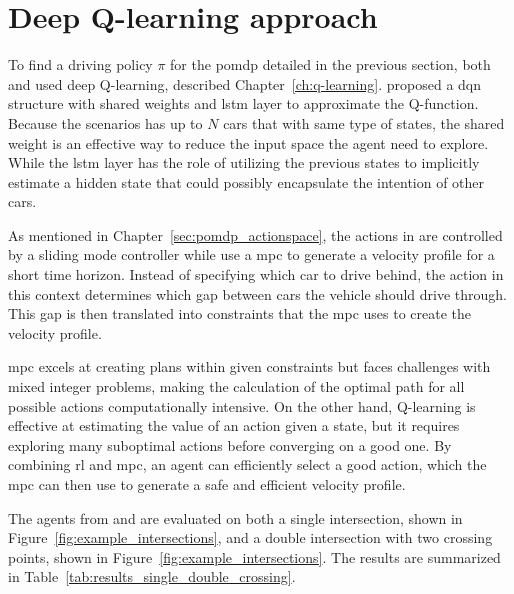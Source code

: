 \section{Deep Q-learning approach}
To find a driving policy $\pi$ for the \gls{pomdp} detailed in the previous section, both \paperLSTM and \paperMPC used deep Q-learning, described Chapter~\ref{ch:q-learning}. \paperLSTM proposed a \gls{dqn} structure with shared weights and \gls{lstm} layer to approximate the Q-function. Because the scenarios has up to $N$ cars that with same type of states, the shared weight is an effective way to reduce the input space the agent need to explore. While the \gls{lstm} layer has the role of utilizing the previous states to implicitly estimate a hidden state that could possibly encapsulate the intention of other cars.

As mentioned in Chapter~\ref{sec:pomdp_actionspace}, the actions in \paperLSTM are controlled by a sliding mode controller while \paperMPC use a \gls{mpc} to generate a velocity profile for a short time horizon. Instead of specifying which car to drive behind, the action in this context determines which gap between cars the vehicle should drive through. This gap is then translated into constraints that the \gls{mpc} uses to create the velocity profile.

\gls{mpc} excels at creating plans within given constraints but faces challenges with mixed integer problems, making the calculation of the optimal path for all possible actions computationally intensive. On the other hand, Q-learning is effective at estimating the value of an action given a state, but it requires exploring many suboptimal actions before converging on a good one. By combining \gls{rl} and \gls{mpc}, an agent can efficiently select a good action, which the \gls{mpc} can then use to generate a safe and efficient velocity profile.

The agents from \paperLSTM and \paperMPC are evaluated on both a single intersection, shown in Figure~\ref{fig:example_intersections}, and a double intersection with two crossing points, shown in Figure~\ref{fig:example_intersections}. The results are summarized in Table~\ref{tab:results_single_double_crossing}.

